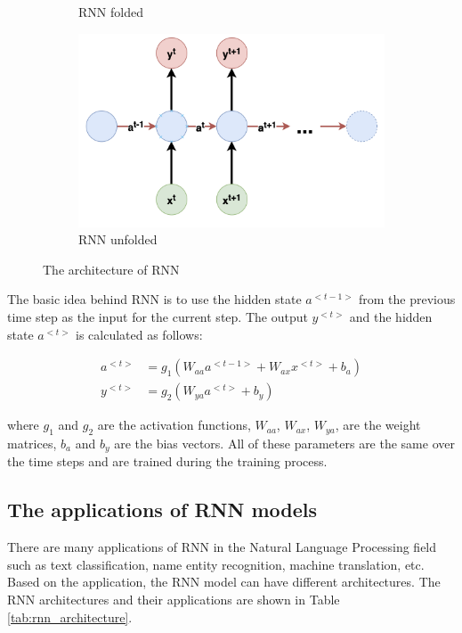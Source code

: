 \begin{figure}[ht]
\begin{subfigure}[b]{0.3\textwidth}
        \caption{RNN folded}
        \label{fig:rnn_fold}
    \end{subfigure}
    \begin{subfigure}[b]{0.65\textwidth}
        \centering
        \includegraphics[height=0.25\textheight]{Images/5.Theoretical_Background/rnn_unfold.png}
        \caption{RNN unfolded}
        \label{fig:rnn_unfold}
    \end{subfigure}
    \caption{The architecture of RNN}
\end{figure}

The basic idea behind RNN is to use the hidden state $a^{<t-1>}$ from the previous time step as the input for the current step. The output $y^{<t>}$ and the hidden state $a^{<t>}$ is calculated as follows:

\begin{align*}
    a^{<t>} &= g_{1}(W_{aa}a^{<t-1>} + W_{ax}x^{<t>} + b_a) \\
    y^{<t>} &= g_{2}(W_{ya}a^{<t>} + b_y)
\end{align*}

\noindent where $g_{1}$ and $g_{2}$ are the activation functions, $W_{aa}$, $W_{ax}$, $W_{ya}$, are the weight matrices, $b_a$ and $b_y$ are the bias vectors. All of these parameters are the same over the time steps and are trained during the training process.

\subsection{The applications of RNN models}
There are many applications of RNN in the Natural Language Processing field such as text classification, name entity recognition, machine translation, etc. Based on the application, the RNN model can have different architectures. The RNN architectures and their applications are shown in Table \ref{tab:rnn_architecture}.

